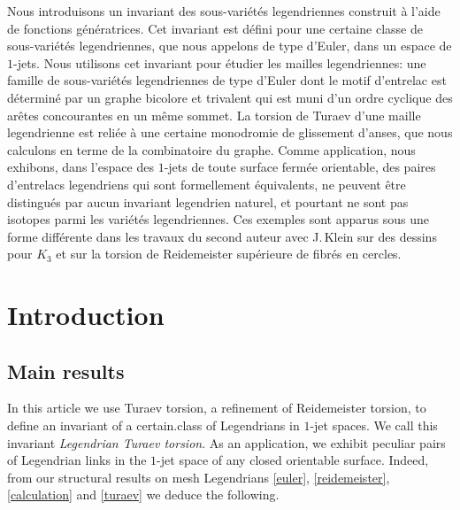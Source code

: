 \documentclass[JEP,XML,SOM,Unicode,NoFloatCountersInSection]{cedram}
\theoremstyle{plain}
\theoremstyle{definition}
\begin{document}
\begin{altabstract}
Nous introduisons un invariant des sous-variétés legendriennes construit à l'aide de fonctions génératrices. Cet invariant est défini pour une certaine classe de sous-variétés legendriennes, que nous appelons de type d'Euler, dans un espace de $1$-jets. Nous utilisons cet invariant pour étudier les mailles legendriennes: une famille de sous-variétés legendriennes de type d'Euler dont le motif d'entrelac est déterminé par un graphe bicolore et trivalent qui est muni d'un ordre cyclique des arêtes concourantes en un même sommet. La torsion de Turaev d'une maille legendrienne est reliée à une certaine mono\-dromie de glissement d'anses, que nous calculons en terme de la combinatoire du graphe. Comme application, nous exhibons, dans l'espace des $1$-jets de toute surface fermée orientable, des paires d'entrelacs legendriens qui sont formellement équivalents, ne peuvent être distingués par aucun invariant legendrien naturel, et pourtant ne sont pas isotopes parmi les variétés legendriennes. Ces exemples sont apparus sous une forme différente dans les travaux du second auteur avec J.\,Klein sur des dessins pour $K_3$ et sur la torsion de Reidemeister supérieure de fibrés en cercles.
\end{altabstract}

\maketitle
\vspace*{-\baselineskip}\enlargethispage{.5\baselineskip}
\tableofcontents
\mainmatter

\section{Introduction}\label{Section: introduction}

\subsection{Main results}\label{Subsection: main results}

In this article we use Turaev torsion, a refinement of Reidemeister torsion, to define an invariant of a certain.class of Legendrians in $1$-jet spaces. We call this invariant {\it Legendrian Turaev torsion}. As an application, we \hbox{exhibit} \hbox{peculiar} pairs of Legendrian links in the $1$-jet space of any closed orientable surface. Indeed, from our structural results on mesh Legendrians \ref{euler}, \ref{reidemeister}, \ref{calculation} and \ref{turaev} we deduce the following.
\end{document}

